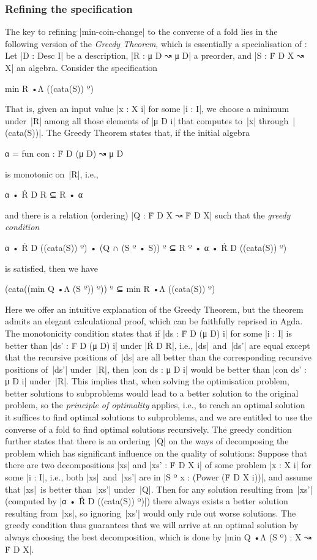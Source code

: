 \subsubsection{Refining the specification}

The key to refining |min-coin-change| to the converse of a fold lies in the following version of the \emph{Greedy Theorem}, which is essentially a specialisation of :
Let |D : Desc I| be a description, |R : μ D ↝ μ D| a preorder, and |S : Ḟ D X ↝ X| an algebra.
Consider the specification
\begin{code}
min R •Λ ((cata(S)) º)
\end{code}
That is, given an input value |x : X i| for some |i : I|, we choose a minimum under~|R| among all those elements of |μ D i| that computes to~|x| through~|(cata(S))|.
The Greedy Theorem states that, if the initial algebra
\begin{code}
α = fun con : Ḟ D (μ D) ↝ μ D
\end{code}
is monotonic on~|R|, i.e.,
\begin{code}
α • Ṙ D R ⊆ R • α
\end{code}
and there is a relation (ordering) |Q : Ḟ D X ↝ Ḟ D X| such that the \emph{greedy condition}
\begin{code}
α • Ṙ D ((cata(S)) º) • (Q ∩ (S º • S)) º ⊆ R º • α • Ṙ D ((cata(S)) º)
\end{code}
is satisfied, then we have
\begin{code}
(cata((min Q •Λ (S º)) º)) º ⊆ min R •Λ ((cata(S)) º)
\end{code}
Here we offer an intuitive explanation of the Greedy Theorem, but the theorem admits an elegant calculational proof, which can be faithfully reprised in Agda.
The monotonicity condition states that if |ds : Ḟ D (μ D) i| for some |i : I| is better than |ds' : Ḟ D (μ D) i| under |Ṙ D R|, i.e., |ds|~and~|ds'| are equal except that the recursive positions of~|ds| are all better than the corresponding recursive positions of~|ds'| under~|R|, then |con ds : μ D i| would be better than |con ds' : μ D i| under~|R|.
This implies that, when solving the optimisation problem, better solutions to subproblems would lead to a better solution to the original problem, so the \emph{principle of optimality} applies, i.e., to reach an optimal solution it suffices to find optimal solutions to subproblems, and we are entitled to use the converse of a fold to find optimal solutions recursively.
The greedy condition further states that there is an ordering~|Q| on the ways of decomposing the problem which has significant influence on the quality of solutions:
Suppose that there are two decompositions |xs| and |xs' : Ḟ D X i| of some problem |x : X i| for some |i : I|, i.e., both |xs|~and~|xs'| are in |S º x : (Power (Ḟ D X i))|, and assume that |xs|~is better than~|xs'| under~|Q|.
Then for any solution resulting from~|xs'| (computed by |α • Ṙ D ((cata(S)) º)|) there always exists a better solution resulting from~|xs|, so ignoring~|xs'| would only rule out worse solutions.
The greedy condition thus guarantees that we will arrive at an optimal solution by always choosing the best decomposition, which is done by |min Q •Λ (S º) : X ↝ Ḟ D X|.

